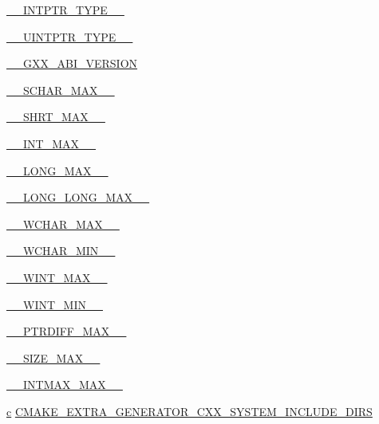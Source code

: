 \begin{DoxyCompactItemize}
\hyperlink{CMakeCache_8txt_ac93efd8e9d485881d53ab451f844c8ec}{\+\_\+\+\_\+\+I\+N\+T\+P\+T\+R\+\_\+\+T\+Y\+P\+E\+\_\+\+\_\+}
\item 
\hyperlink{CMakeCache_8txt_a835a336a71d176cb81526e3e2acf8343}{\+\_\+\+\_\+\+U\+I\+N\+T\+P\+T\+R\+\_\+\+T\+Y\+P\+E\+\_\+\+\_\+}
\item 
\hyperlink{CMakeCache_8txt_af2a3b27e09cc851abc4ef3e7daea66c2}{\+\_\+\+\_\+\+G\+X\+X\+\_\+\+A\+B\+I\+\_\+\+V\+E\+R\+S\+I\+ON}
\item 
\hyperlink{CMakeCache_8txt_ad1e3a625f5463100aab8db5fedf63d52}{\+\_\+\+\_\+\+S\+C\+H\+A\+R\+\_\+\+M\+A\+X\+\_\+\+\_\+}
\item 
\hyperlink{CMakeCache_8txt_aaa2dae7d1963575bc4e3e95e3fee9ed4}{\+\_\+\+\_\+\+S\+H\+R\+T\+\_\+\+M\+A\+X\+\_\+\+\_\+}
\item 
\hyperlink{CMakeCache_8txt_a9fce70495bb7d54b8b4adc9f7f63ea8e}{\+\_\+\+\_\+\+I\+N\+T\+\_\+\+M\+A\+X\+\_\+\+\_\+}
\item 
\hyperlink{CMakeCache_8txt_a9efbe01f7e7b66cbdac106fb51e2f65f}{\+\_\+\+\_\+\+L\+O\+N\+G\+\_\+\+M\+A\+X\+\_\+\+\_\+}
\item 
\hyperlink{CMakeCache_8txt_ade7a297151900f13d47b71e6a9dda0a1}{\+\_\+\+\_\+\+L\+O\+N\+G\+\_\+\+L\+O\+N\+G\+\_\+\+M\+A\+X\+\_\+\+\_\+}
\item 
\hyperlink{CMakeCache_8txt_ab06c84ef26aaf126084f60730505b6b4}{\+\_\+\+\_\+\+W\+C\+H\+A\+R\+\_\+\+M\+A\+X\+\_\+\+\_\+}
\item 
\hyperlink{CMakeCache_8txt_ab2394184364567c4286a32eec574295e}{\+\_\+\+\_\+\+W\+C\+H\+A\+R\+\_\+\+M\+I\+N\+\_\+\+\_\+}
\item 
\hyperlink{CMakeCache_8txt_ade9fb9056c1b3e7f9417478f12ac5452}{\+\_\+\+\_\+\+W\+I\+N\+T\+\_\+\+M\+A\+X\+\_\+\+\_\+}
\item 
\hyperlink{CMakeCache_8txt_a0101eb15159977cbfe763d0d71a7023f}{\+\_\+\+\_\+\+W\+I\+N\+T\+\_\+\+M\+I\+N\+\_\+\+\_\+}
\item 
\hyperlink{CMakeCache_8txt_a047880d1824d5ce75ac17952c273fcc5}{\+\_\+\+\_\+\+P\+T\+R\+D\+I\+F\+F\+\_\+\+M\+A\+X\+\_\+\+\_\+}
\item 
\hyperlink{CMakeCache_8txt_ad4abf877d7a79e3d1d13494ce6d64d73}{\+\_\+\+\_\+\+S\+I\+Z\+E\+\_\+\+M\+A\+X\+\_\+\+\_\+}
\item 
\hyperlink{CMakeCache_8txt_a6b068320140ebfbbeaa001c18465ea9e}{\+\_\+\+\_\+\+I\+N\+T\+M\+A\+X\+\_\+\+M\+A\+X\+\_\+\+\_\+}
\item 
\hyperlink{CMakeCache_8txt_aac1d6a1710812201527c735f7c6afbaa}{c} \hyperlink{CMakeCache_8txt_ae84758144b16fbed96a3e6ea5781d3ad}{C\+M\+A\+K\+E\+\_\+\+E\+X\+T\+R\+A\+\_\+\+G\+E\+N\+E\+R\+A\+T\+O\+R\+\_\+\+C\+X\+X\+\_\+\+S\+Y\+S\+T\+E\+M\+\_\+\+I\+N\+C\+L\+U\+D\+E\+\_\+\+D\+I\+RS}

\end{DoxyCompactItemize}
